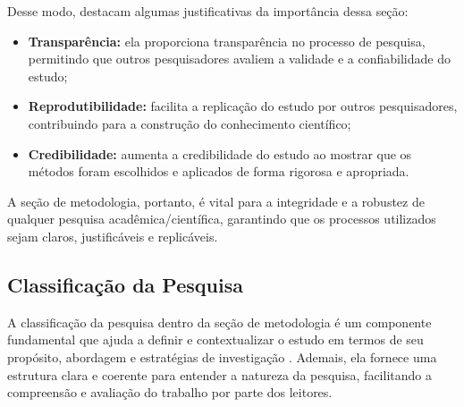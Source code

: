 Desse modo,  destacam algumas justificativas da importância dessa seção:
\begin{itemize}[nosep, leftmargin=2.3cm]
    \item \textbf{Transparência:} ela proporciona transparência no processo de pesquisa, permitindo que outros pesquisadores avaliem a validade e a confiabilidade do estudo;
    \item \textbf{Reprodutibilidade:} facilita a replicação do estudo por outros pesquisadores, contribuindo para a construção do conhecimento científico;
    \item \textbf{Credibilidade:} aumenta a credibilidade do estudo ao mostrar que os métodos foram escolhidos e aplicados de forma rigorosa e apropriada.
\end{itemize}

A seção de metodologia, portanto, é vital para a integridade e a robustez de qualquer pesquisa acadêmica/científica, garantindo que os processos utilizados sejam claros, justificáveis e replicáveis.

\subsection{Classificação da Pesquisa}\label{sec:classif_pesquisa}

A classificação da pesquisa dentro da seção de metodologia é um componente fundamental que ajuda a definir e contextualizar o estudo em termos de seu propósito, abordagem e estratégias de investigação \cite{Wazlawick2021,Marconi2022}. Ademais, ela fornece uma estrutura clara e coerente para entender a natureza da pesquisa, facilitando a compreensão e avaliação do trabalho por parte dos leitores.


